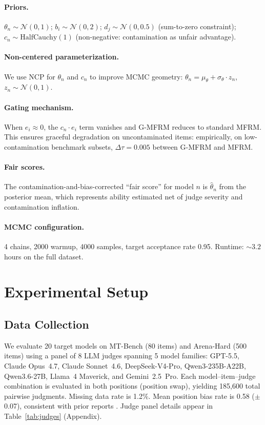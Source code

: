 \documentclass[11pt,twocolumn]{article}
\newcommand{\thetahat}{\hat{\theta}}
\newcommand{\gmfrm}{\textsc{G-MFRM}}
\begin{document}
\paragraph{Priors.} $\theta_n \sim \mathcal{N}(0, 1)$; $b_i \sim \mathcal{N}(0, 2)$; $d_j \sim \mathcal{N}(0, 0.5)$ (sum-to-zero constraint); $c_n \sim \text{HalfCauchy}(1)$ (non-negative: contamination as unfair advantage).

\paragraph{Non-centered parameterization.} We use NCP for $\theta_n$ and $c_n$ to improve MCMC geometry: $\theta_n = \mu_\theta + \sigma_\theta \cdot z_n$, $z_n \sim \mathcal{N}(0,1)$.

\paragraph{Gating mechanism.} When $e_i \approx 0$, the $c_n \cdot e_i$ term vanishes and \gmfrm{} reduces to standard MFRM. This ensures graceful degradation on uncontaminated items: empirically, on low-contamination benchmark subsets, $\Delta\tau = 0.005$ between \gmfrm{} and MFRM.

\paragraph{Fair scores.} The contamination-and-bias-corrected ``fair score'' for model $n$ is $\thetahat_n$ from the posterior mean, which represents ability estimated net of judge severity and contamination inflation.

\paragraph{MCMC configuration.} 4 chains, 2000 warmup, 4000 samples, target acceptance rate 0.95. Runtime: ${\sim}3.2$ hours on the full dataset.

\section{Experimental Setup}

\subsection{Data Collection}

We evaluate 20 target models on MT-Bench (80 items) and Arena-Hard (500 items) using a panel of 8 LLM judges spanning 5 model families: GPT-5.5, Claude Opus~4.7, Claude Sonnet~4.6, DeepSeek-V4-Pro, Qwen3-235B-A22B, Qwen3.6-27B, Llama~4 Maverick, and Gemini~2.5~Pro. Each model--item--judge combination is evaluated in both positions (position swap), yielding 185,600 total pairwise judgments. Missing data rate is 1.2\%. Mean position bias rate is 0.58 ($\pm$0.07), consistent with prior reports \citep{zheng2024judging}. Judge panel details appear in Table~\ref{tab:judges} (Appendix).
\end{document}
